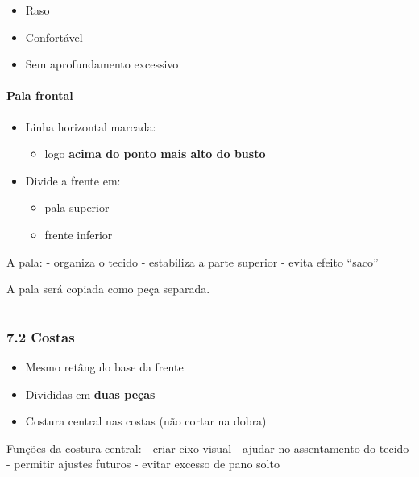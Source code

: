 \documentclass[
  10pt,oneside]{article}
\providecommand{\tightlist}{%
  \setlength{\itemsep}{0pt}\setlength{\parskip}{0pt}}
\begin{document}
\begin{itemize}
\tightlist
\item
  Raso
\item
  Confortável
\item
  Sem aprofundamento excessivo
\end{itemize}

\paragraph{Pala frontal}\label{pala-frontal}

\begin{itemize}
\tightlist
\item
  Linha horizontal marcada:

  \begin{itemize}
  \tightlist
  \item
    logo \textbf{acima do ponto mais alto do busto}
  \end{itemize}
\item
  Divide a frente em:

  \begin{itemize}
  \tightlist
  \item
    pala superior
  \item
    frente inferior
  \end{itemize}
\end{itemize}

A pala:
- organiza o tecido
- estabiliza a parte superior
- evita efeito ``saco''

A pala será copiada como peça separada.

\begin{center}\rule{0.5\linewidth}{0.5pt}\end{center}

\subsubsection{7.2 Costas}\label{costas}

\begin{itemize}
\tightlist
\item
  Mesmo retângulo base da frente
\item
  Divididas em \textbf{duas peças}
\item
  Costura central nas costas (não cortar na dobra)
\end{itemize}

Funções da costura central:
- criar eixo visual
- ajudar no assentamento do tecido
- permitir ajustes futuros
- evitar excesso de pano solto
\end{document}
